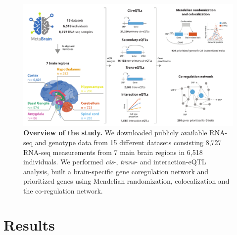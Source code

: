 \begin{figure}[h!]
	\includegraphics[width=\textwidth]{chapters/chapter5-brain-eqtls/img/2021-02-11-fig1-abstract_figure_v7.pdf}
	\caption{\textbf{Overview of the study.} We downloaded publicly available RNA-seq and genotype data from 15 different datasets consisting 8,727 RNA-seq measurements from 7 main brain regions in 6,518 individuals. We performed \textit{cis}-, \textit{trans}- and interaction-eQTL analysis, built a brain-specific gene coregulation network and prioritized genes using Mendelian randomization, colocalization and the co-regulation network.}
	\label{metabrain_fig1} 
\end{figure}


\section{Results}
